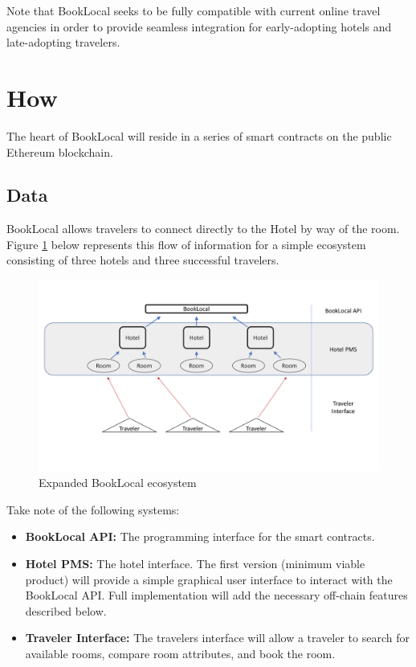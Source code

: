 \documentclass{article}
\begin{document}
\begin{flushleft}
Note that BookLocal seeks to be fully compatible with current online travel agencies in order to provide seamless integration for early-adopting hotels and late-adopting travelers. 
\end{flushleft}



\newpage
\section{How}
The heart of BookLocal will reside in a series of smart contracts on the public Ethereum blockchain. 
\subsection{Data}
\begin{flushleft}
BookLocal allows travelers to connect directly to the Hotel by way of the room. Figure \ref{blExp} below represents this flow of information for a simple ecosystem consisting of three hotels and three successful travelers. 
\end{flushleft}

\begin{figure}[H]
\centering
\includegraphics[width = .9\textwidth]{bookLocal_ecosystem2.pdf}
\caption{Expanded BookLocal ecosystem}
\label{blExp}
\end{figure}

Take note of the following systems: 
\begin{itemize}
\item \textbf{BookLocal API:} The programming interface for the smart contracts. 
\item \textbf{Hotel PMS:} The hotel interface. The first version (minimum viable product) will provide a simple graphical user interface to interact with the BookLocal API. Full implementation will add the necessary off-chain features described below.
\item \textbf{Traveler Interface:} The travelers interface will allow a traveler to search for available rooms, compare room attributes, and book the room. 
\end{itemize}
\end{document}
